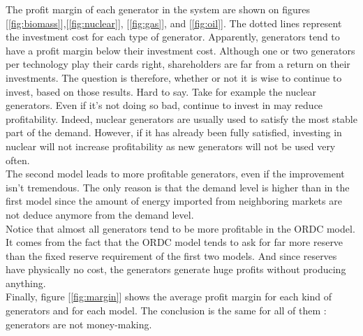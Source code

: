 
The profit margin of each generator in the system are shown on figures [\ref{fig:biomass}],[\ref{fig:nuclear}], [\ref{fig:gas}], and [\ref{fig:oil}]. The dotted lines represent the investment cost for each type of generator. Apparently, generators tend to have a profit margin below their investment cost. Although one or two generators per technology play their cards right, shareholders are far from a return on their investments. The question is therefore, whether or not it is wise to continue to invest, based on those results. Hard to say. Take for example the nuclear generators. Even if it's not doing so bad, continue to invest in may reduce profitability. Indeed, nuclear generators are usually used to satisfy the most stable part of the demand. However, if it has already been fully satisfied, investing in nuclear will not increase profitability as new generators will not be used very often.\\

The second model leads to more profitable generators, even if the improvement isn't tremendous. The only reason is that the demand level is higher than in the first model since the amount of energy imported from neighboring markets are not deduce anymore from the demand level.\\

Notice that almost all generators tend to be more profitable in the ORDC model. It comes from the fact that the ORDC model tends to ask for far more reserve than the fixed reserve requirement of the first two models. And since reserves have physically no cost, the generators generate huge profits without producing anything. \\

Finally, figure [\ref{fig:margin}] shows the average profit margin for each kind of generators and for each model. The conclusion is the same for all of them : generators are not money-making.

